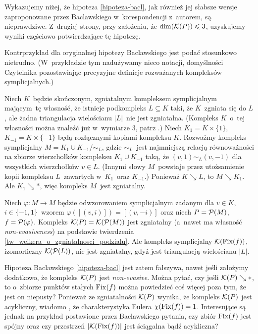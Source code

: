 Wykazujemy niżej, że hipoteza \ref{hipoteza-bacl}, jak również jej słabsze wersje zaproponowane przez Baclawskiego \cite{Baclawskia} w~korespondencji z~autorem, są nieprawdziwe. Z~drugiej strony, przy założeniu, że $\dim(\mathcal{K}(P))\leqslant 3$, uzyskujemy wyniki częściowo potwierdzające tę hipotezę.

Kontrprzykład dla oryginalnej hipotezy Baclawskiego jest podać stosunkowo nietrudno. (W~przykładzie tym nadużywamy nieco notacji, domyślności Czytelnika pozostawiając precyzyjne definicje rozważanych kompleksów symplicjalnych.)
\begin{ex}
Niech $K$~będzie skończonym, zgniatalnym kompleksem symplicjalnym mającym~tę własność, że istnieje podkompleks $L\subseteq K$ taki, że $K$~zgniata się do $L$, ale żadna triangulacja wielościanu $|L|$~nie jest zgniatalna. (Kompleks $K$~o~tej własności można znaleźć już w~wymiarze $3$, patrz \cite{Benedetti13a}.) Niech $K_1=K\times\{1\}$, $K_{-1}=K\times\{-1\}$ będą rozłącznymi kopiami kompleksu $K$. Rozważmy kompleks symplicjalny $M=K_1\cup K_{-1}\big/\mathord{\sim_L}$, gdzie $\sim_L$~jest najmniejszą relacją równoważności na zbiorze wierzchołków kompleksu $K_1\cup K_{-1}$ taką, że $(v,1)\sim_L (v,-1)$ dla wszystkich wierzchołków $v\in L$. (Innymi słowy $M$~powstaje przez utożsamienie kopii kompleksu $L$~zawartych w~$K_1$~oraz $K_{-1}$.) Ponieważ $K\searrow L$, to $M\searrow K_1$. Ale $K_1\searrow *$, więc kompleks $M$~jest zgniatalny.

Niech $\varphi\colon M\to M$ będzie odwzorowaniem symplicjalnym zadanym dla $v\in K$, $i\in\{-1,1\}$~wzorem $\varphi\left([(v,i)]\right)=[(v,-i)]$ oraz niech $P=\mathcal{P}(M)$, $f=\mathcal{P}(\varphi)$. Kompleks $\mathcal{K}(P)=\mathcal{K}(\mathcal{P}(M))$ jest zgniatalny (a~nawet ma własność \textit{non-evasiveness}) na podstawie twierdzenia \ref{tw_welkera_o_zgniatalnosci_podzialu}. Ale kompleks symplicjalny $\mathcal{K}(\operatorname{Fix}(f))$, izomorficzny $\mathcal{K}(\mathcal{P}(L))$, nie jest zgniatalny, gdyż jest triangulacją wielościanu $|L|$.
\end{ex}

Hipoteza Baclawskiego \ref{hipoteza-bacl} jest zatem fałszywa, nawet jeśli założymy dodatkowo, że kompleks $\mathcal{K}(P)$ jest \textit{non-evasive}. Można pytać, czy jeśli $\mathcal{K}(P)\searrow *$, to o~zbiorze punktów stałych $\operatorname{Fix}(f)$ można powiedzieć coś więcej poza tym, że jest on niepusty? Ponieważ ze zgniatalności $\mathcal{K}(P)$ wynika, że kompleks $\mathcal{K}(P)$ jest acykliczny, wiadomo \cite[Theorem 1.1]{Baclawski79}, że charakterystyka Eulera $\chi(\operatorname{Fix}(f))=1$. Interesujące są jednak na przykład postawione przez Baclawskiego \cite{Baclawskia} pytania, czy zbiór $\operatorname{Fix}(f)$ jest spójny oraz czy przestrzeń $|\mathcal{K}(\operatorname{Fix}(f))|$ jest ściągalna bądź acykliczna? 

